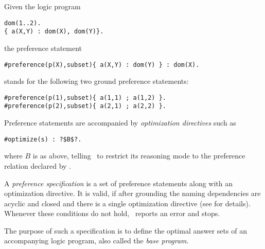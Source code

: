 \begin{example}
\label{asprin:example2}
Given the logic program 
\begin{lstlisting}[numbers=none]
dom(1..2).
{ a(X,Y) : dom(X), dom(Y)}.
\end{lstlisting}
the preference statement 
\begin{lstlisting}[numbers=none]
#preference(p(X),subset){ a(X,Y) : dom(Y) } : dom(X).
\end{lstlisting}
stands for the following two ground preference statements:
\begin{lstlisting}[numbers=none]
#preference(p(1),subset){ a(1,1) ; a(1,2) }.
#preference(p(2),subset){ a(2,1) ; a(2,2) }.
\end{lstlisting}
\end{example}

Preference statements are accompanied by 
\emph{optimization directives} such as
\begin{lstlisting}[numbers=none,escapechar=?]
#optimize(s) : ?$B$?.
\end{lstlisting}
where $B$ is as above, 
telling \asprin\ to restrict its reasoning mode to the preference relation declared by .
% 

A \emph{preference specification} is a set of preference statements along with an optimization directive.
It is valid, if after grounding the naming dependencies are acyclic and closed
and there is a single optimization directive
(see \cite{brderosc15a} for details).
Whenever these conditions do not hold, \asprin\ reports an error and stops.

The purpose of such a specification is to define the optimal answer sets of an accompanying logic program,
also called the \emph{base program}.

